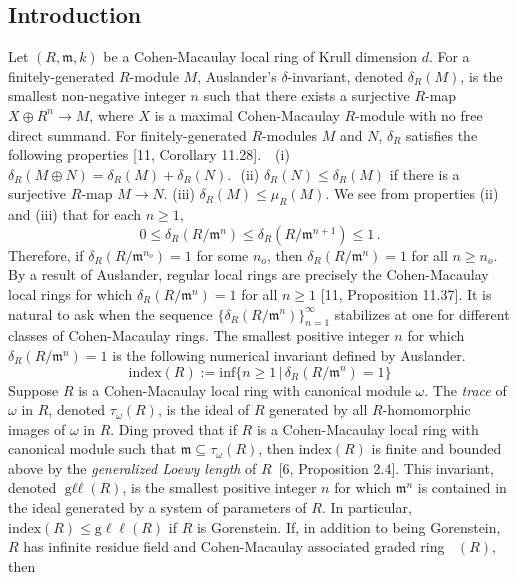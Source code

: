 \documentclass{amsart}
\theoremstyle{definition}
\theoremstyle{definition}
\DeclareMathOperator{\gr}{\text{gr}_{\mathfrak{m}}}
\DeclareMathOperator{\gll}{\text{g}\ell\ell}
\numberwithin{equation}{section}
\theoremstyle{definition}
\begin{document}
\large{
\begin{center} \section{Introduction} \end{center} Let $(R,\mathfrak{m},k)$ be a Cohen-Macaulay local ring of Krull dimension $d$. For a finitely-generated $R$-module $M$, Auslander's $\delta$-invariant, denoted $\delta_{R}(M)$, is the smallest non-negative integer $n$ such that there exists a surjective $R$-map $X \oplus R^{n} \longrightarrow M$, where $X$ is a maximal Cohen-Macaulay $R$-module with no free direct summand. For finitely-generated $R$-modules $M$ and $N$, $\delta_{R}$ satisfies the following properties [11, Corollary 11.28]. \newline\newline
\text{}\,\,\,\,(i) $\delta_{R}(M \oplus N)=\delta_{R}(M)+\delta_{R}(N)$. \newline
\text{}\,\,(ii) $\delta_{R}(N) \leq \delta_{R}(M)$ if there is a surjective $R$-map $M \longrightarrow N$. \newline
\text{}(iii) $\delta_{R}(M) \leq \mu_{R}(M)$. \newline\newline
We see from properties (ii) and (iii) that for each $n \geq 1$,\newline \begin{equation*}0 \leq \delta_{R}(R/\mathfrak{m}^{n}) \leq \delta_{R}(R/\mathfrak{m}^{n+1}) \leq 1\,. \end{equation*} \text{}\newline Therefore, if $\delta_{R}(R/\mathfrak{m}^{n_{o}})=1$ for some $n_{o}$, then $\delta_{R}(R/\mathfrak{m}^{n})=1$ for all $n \geq n_{o}$. By a result of Auslander, regular local rings are precisely the Cohen-Macaulay local rings for which $\delta_{R}(R/\mathfrak{m}^{n})=1$ for all $n \geq 1$ [11, Proposition 11.37]. It is natural to ask when the sequence $\{\delta_{R}(R/\mathfrak{m}^{n})\}_{n=1}^{\infty}$ stabilizes at one for different classes of Cohen-Macaulay rings. The smallest positive integer $n$ for which $\delta_{R}(R/\mathfrak{m}^{n})=1$ is the following numerical invariant defined by Auslander. \newline
\[ \text{index}(R):=\text{inf}\{n \geq 1\,|\,\delta_{R}(R/\mathfrak{m}^{n})=1\}\]
\text{}\newline Suppose $R$ is a Cohen-Macaulay local ring with canonical module $\omega$. The {\it{trace}} of $\omega$ in $R$, denoted $\tau_{\omega}(R)$, is the ideal of $R$ generated by all $R$-homomorphic images of $\omega$ in $R$. Ding proved that if $R$ is a Cohen-Macaulay local ring with canonical module such that $\mathfrak{m} \subseteq \tau_{\omega}(R)$, then $\text{index}(R)$ is finite and bounded above by the {\it{generalized Loewy length}} of $R$ \,[6, Proposition 2.4]. This invariant, denoted $\gll(R)$, is the smallest positive integer $n$ for which $\mathfrak{m}^{n}$ is contained in the ideal generated by a system of parameters of $R$. In particular, $\text{index}(R) \leq \text{g}\ell\ell(R)$ if $R$ is Gorenstein. If, in addition to being Gorenstein, $R$ has infinite residue field and Cohen-Macaulay associated graded ring $\gr(R)$, then
}
\end{document}
